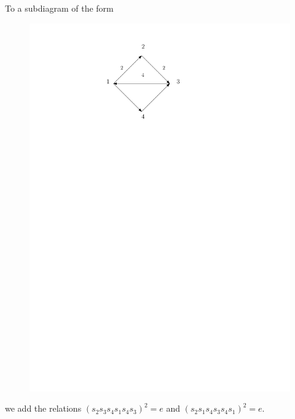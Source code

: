 \documentclass{beamer}
\begin{document}
\begin{frame}
To a subdiagram of the form
\begin{figure}
\includegraphics[scale = .50]{Diagram3.pdf}
\end{figure}
we add the relations $(s_{2}s_{3}s_{4}s_{1}s_{4}s_{3})^{2} = e$ and $(s_{2}s_{1}s_{4}s_{3}s_{4}s_{1})^{2} = e$.
\end{frame}
\end{document}

